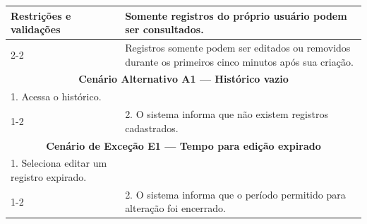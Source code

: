 \begin{longtable}{| p{} | p{} |}
\multirow{2}{.40\textwidth}{\textbf{Restrições e validações}}
&
Somente registros do próprio usuário podem ser consultados. \\
\cline{2-2}

&
Registros somente podem ser editados ou removidos durante os
primeiros cinco minutos após sua criação. \\
\hline

\multicolumn{2}{|c|}{\textbf{Cenário Alternativo A1 --- Histórico vazio}}\\
\hline

1. Acessa o histórico. & \\
\cline{1-2}

&
2. O sistema informa que não existem registros cadastrados. \\
\hline

\multicolumn{2}{|c|}{\textbf{Cenário de Exceção E1 --- Tempo para edição expirado}}\\
\hline

1. Seleciona editar um registro expirado. & \\
\cline{1-2}

&
2. O sistema informa que o período permitido para alteração foi encerrado. \\
\hline

\end{longtable}
